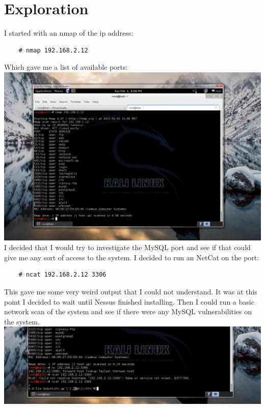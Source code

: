 \documentclass[12pt]{report}
\begin{document}
\section{Exploration}
I started with an nmap of the ip address:
	\begin{verbatim}
	# nmap 192.168.2.12
	\end{verbatim}
Which gave me a list of available ports:\\
\includegraphics[scale=0.33, width=\linewidth]{list_of_ports.PNG}
\newline
I decided that I would try to investigate the MySQL port and see if that could give me any sort of access to the system. I decided to run an NetCat on the port:
	\begin{verbatim}
	# ncat 192.168.2.12 3306
	\end{verbatim}
This gave me some very weird output that I could not understand. It was at this point I decided to wait until Nessus finished installing. Then I could run a basic network scan of the system and see if there were any MySQL vulnerabilities on the system.\\
\includegraphics[scale=0.33, width=\linewidth]{ncat_sql_return_info.PNG}
\newline
\end{document}
